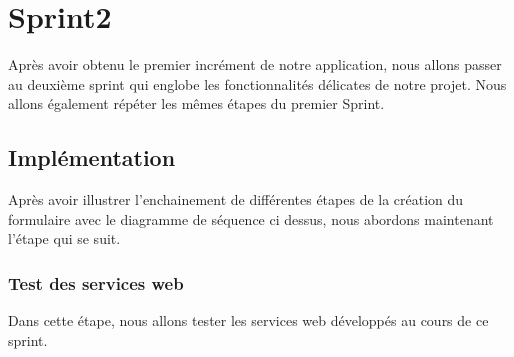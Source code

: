 \section{Sprint2}
Après avoir obtenu le premier incrément de notre application, nous allons passer au deuxième sprint qui englobe les fonctionnalités délicates de notre projet.
Nous allons également répéter les mêmes étapes du premier Sprint.
\newpage

\subsection{Implémentation}
Après avoir illustrer l’enchainement de différentes étapes de la création du formulaire avec le diagramme de séquence ci dessus, nous abordons maintenant l’étape qui se suit.
\subsubsection{Test des services web}
Dans cette étape, nous allons tester les services web développés au cours de ce sprint.

\newpage


